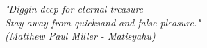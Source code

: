 \begin{epigrafe}
    \vspace*{\fill}
	\begin{flushright}
		\textit{"Diggin deep for eternal treasure \\ Stay away from quicksand and false pleasure." \\
		(Matthew Paul Miller - Matisyahu)}
	\end{flushright}
\end{epigrafe}
